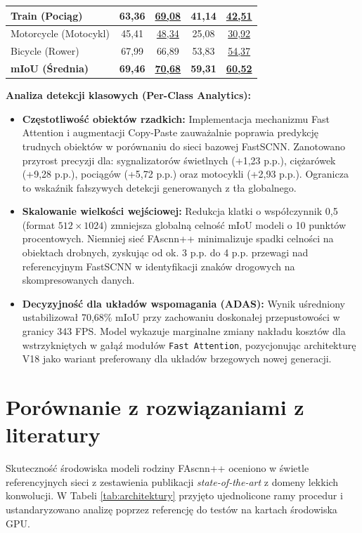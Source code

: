 \begin{table}[htbp]
{\begin{tabular}{|l||c|c||c|c|}
Train (Pociąg)               & 63,36 & \underline{69,08} & 41,14 & \underline{42,51} \\ \hline
Motorcycle (Motocykl)        & 45,41 & \underline{48,34} & 25,08 & \underline{30,92} \\ \hline
Bicycle (Rower)              & 67,99 & 66,89 & 53,83 & \underline{54,37} \\ \hline\hline
\textbf{mIoU (Średnia)}      & \textbf{69,46} & \textbf{\underline{70,68}} & \textbf{59,31} & \textbf{\underline{60,52}} \\ \hline
\end{tabular}
}
\end{table}

\textbf{Analiza detekcji klasowych (Per-Class Analytics):}
\begin{itemize}
    \item \textbf{Częstotliwość obiektów rzadkich:} Implementacja mechanizmu Fast Attention i augmentacji Copy-Paste zauważalnie poprawia predykcję trudnych obiektów w porównaniu do sieci bazowej FastSCNN. Zanotowano przyrost precyzji dla: sygnalizatorów świetlnych (+1,23 p.p.), ciężarówek (+9,28 p.p.), pociągów (+5,72 p.p.) oraz motocykli (+2,93 p.p.). Ogranicza to wskaźnik fałszywych detekcji generowanych z tła globalnego.
    \item \textbf{Skalowanie wielkości wejściowej:} Redukcja klatki o współczynnik 0,5 (format $512 \times 1024$) zmniejsza globalną celność mIoU modeli o 10 punktów procentowych. Niemniej sieć FAscnn++ minimalizuje spadki celności na obiektach drobnych, zyskując od ok. 3 p.p. do 4 p.p. przewagi nad referencyjnym FastSCNN w identyfikacji znaków drogowych na skompresowanych danych.
    \item \textbf{Decyzyjność dla układów wspomagania (ADAS):} Wynik uśredniony ustabilizował 70,68\% mIoU przy zachowaniu doskonałej przepustowości w granicy 343 FPS. Model wykazuje marginalne zmiany nakładu kosztów dla wstrzykniętych w gałąź modułów \texttt{Fast Attention}, pozycjonując architekturę V18 jako wariant preferowany dla układów brzegowych nowej generacji.
\end{itemize}

\section{Porównanie z rozwiązaniami z literatury}
Skuteczność środowiska modeli rodziny FAscnn++ oceniono w świetle referencyjnych sieci z zestawienia publikacji \textit{state-of-the-art} z domeny lekkich konwolucji. W Tabeli \ref{tab:architektury} przyjęto ujednolicone ramy procedur i ustandaryzowano analizę poprzez referencję do testów na kartach środowiska GPU.

